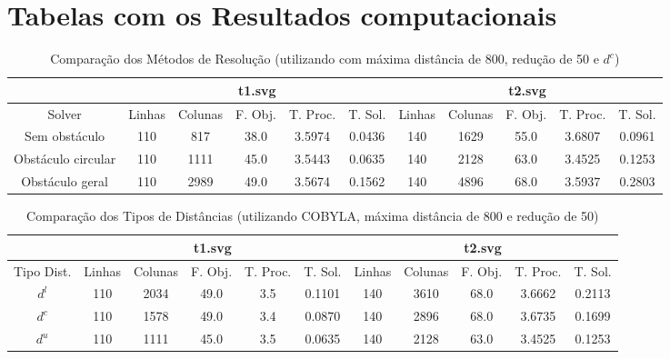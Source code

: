 \section{Tabelas com os Resultados computacionais} \label{sse:tab:resul_comp}

\begin{landscape}
\begin{table}
    \centering
    \caption{Comparação dos Métodos de Resolução (utilizando com máxima distância de 800,
    redução de 50 e $d^c$)}
    \label{tab:solver}
    \begin{tabular}{|c|c|c|c|c|c|c|c|c|c|c|}
        \hline
        & \multicolumn{5}{|c|}{t1.svg} & \multicolumn{5}{|c|}{t2.svg} \\ \hline
        Solver & Linhas & Colunas & F. Obj. & T. Proc. & T. Sol. & Linhas &
        Colunas & F. Obj. & T. Proc. & T. Sol. \\ \hline
        Sem obstáculo & 110 & 817 & 38.0 & 3.5974 & 0.0436 & 140 & 1629 & 55.0 & 3.6807 & 0.0961 \\ \hline
        Obstáculo circular & 110 & 1111 & 45.0 & 3.5443 & 0.0635 & 140 & 2128 & 63.0 & 3.4525 & 0.1253 \\ \hline
        Obstáculo geral & 110 & 2989 & 49.0 & 3.5674 & 0.1562 & 140 & 4896 & 68.0 & 3.5937 & 0.2803 \\ \hline
    \end{tabular}
\end{table}

\begin{table}
    \centering
    \caption{Comparação dos Tipos de Distâncias (utilizando COBYLA, máxima
    distância de 800 e redução de 50)}
    \label{tab:dtype}
    \begin{tabular}{|c|c|c|c|c|c|c|c|c|c|c|}
        \hline
        & \multicolumn{5}{|c|}{t1.svg} & \multicolumn{5}{|c|}{t2.svg} \\ \hline
        Tipo Dist. & Linhas & Colunas & F. Obj. & T. Proc. & T. Sol. & Linhas &
        Colunas & F. Obj. & T. Proc. & T. Sol. \\ \hline
        $d^l$ & 110 & 2034 & 49.0 & 3.5 & 0.1101 & 140 & 3610 & 68.0 & 3.6662 & 0.2113 \\ \hline
        $d^c$ & 110 & 1578 & 49.0 & 3.4 & 0.0870 & 140 & 2896 & 68.0 & 3.6735 & 0.1699 \\ \hline
        $d^u$ & 110 & 1111 & 45.0 & 3.5 & 0.0635 & 140 & 2128 & 63.0 & 3.4525 & 0.1253 \\ \hline
    \end{tabular}
\end{table}


\end{landscape}
